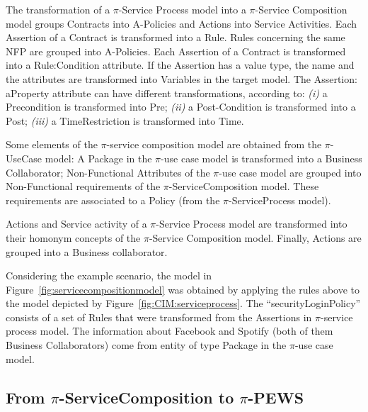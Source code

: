 \documentclass{singlecol-new}
\theoremstyle{TH}{
\newtheorem{lemma}{Lemma}
\newtheorem{theorem}[lemma]{Theorem}
\newtheorem{corrolary}[lemma]{Corrolary}
\newtheorem{conjecture}[lemma]{Conjecture}
\newtheorem{proposition}[lemma]{Proposition}
\newtheorem{claim}[lemma]{Claim}
\newtheorem{stheorem}[lemma]{Wrong Theorem}
\newtheorem{algorithm}{Algorithm}
}
\theoremstyle{THrm}{
\newtheorem{definition}{Definition}[section]
\newtheorem{question}{Question}[section]
\newtheorem{remark}{Remark}
\newtheorem{scheme}{Scheme}
}
\theoremstyle{THhit}{
\newtheorem{case}{Case}[section]
}
\theoremstyle{THhsl}{
\newtheorem{example}{Example}
}
\begin{document}

The transformation  of a  $\pi$-Service Process model into a $\pi$-Service Composition model groups {\sf Contracts} into {\sf A-Policies} and {\sf Actions} into {\sf Service Activities}.   
Each {\sf Assertion} of a {\sf Contract} is transformed into a {\sf Rule}. 
{\sf Rules}  concerning the same NFP  are grouped into {\sf A-Policies}. 
Each {\sf Assertion} of a {\sf Contract} is transformed into a {\sf Rule:Condition} attribute. 
If the {\sf Assertion} has a value type, the name and the attributes are transformed into {\sf Variables} in the target model.  
The {\sf Assertion: aProperty} attribute can have different transformations, according to: 
\textit{(i)} a {\sf Precondition} is transformed into {\sf Pre};
\textit{(ii)} a {\sf Post-Condition} is transformed into a {\sf  Post};
\textit{(iii)} a {\sf TimeRestriction} is transformed into {\sf Time}.

Some elements of the $\pi$-service composition model are obtained from the $\pi$-UseCase model: 
A {\sf Package} in the $\pi$-use case model is transformed into a {\sf Business Collaborator};
\textsf{Non-Functional Attributes} of the $\pi$-use case model are grouped into \textsf{Non-Functional requirements} of the $\pi$-ServiceComposition model. 
These requirements are associated to a \textsf{Policy} (from the $\pi$-ServiceProcess model).


{\sf Actions} and {\sf Service activity} of a $\pi$-Service Process model are transformed into their hom\-onym concepts of the $\pi$-Service Composition model.
Finally, {\sf Actions} are grouped into  a {\sf Business collaborator}.


\begin{example}\label{ex:toPublicMusicT5}
Considering the example scenario, the model in Figure~\ref{fig:servicecompositionmodel} was obtained by applying the rules above to the model depicted by Figure~\ref{fig:CIM:serviceprocess}.  
The ``securityLoginPolicy'' consists of a set of {\sf Rules} that were transformed from the {\sf Assertions} in $\pi$-service process model. 
The information about Facebook and Spotify (both of them {\sf Business Collaborators}) come from entity of type {\sc Package} in the $\pi$-use case
model.
\end{example}

\subsection{From $\pi$-ServiceComposition to $\pi$-PEWS}
\end{document}
